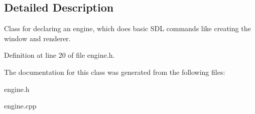 \subsection{Detailed Description}
Class for declaring an engine, which does basic S\+DL commands like creating the window and renderer. 

Definition at line 20 of file engine.\+h.



The documentation for this class was generated from the following files\+:\begin{DoxyCompactItemize}
\item 
engine.\+h\item 
engine.\+cpp\end{DoxyCompactItemize}
